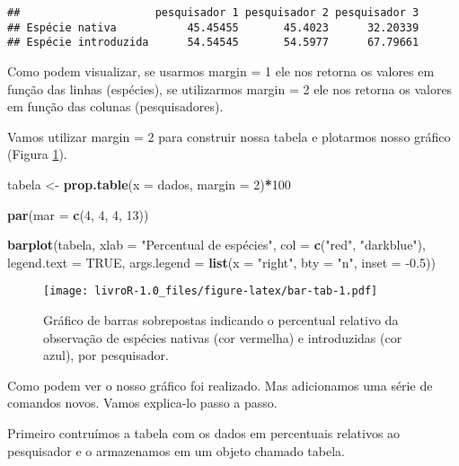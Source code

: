 \documentclass[titlepage, oneside, openany, a4paper]{book}
\newenvironment{Shaded}{\begin{snugshade}}{\end{snugshade}}
\newcommand{\DataTypeTok}[1]{\textcolor[rgb]{0.13,0.29,0.53}{#1}}
\newcommand{\DecValTok}[1]{\textcolor[rgb]{0.00,0.00,0.81}{#1}}
\newcommand{\FloatTok}[1]{\textcolor[rgb]{0.00,0.00,0.81}{#1}}
\newcommand{\KeywordTok}[1]{\textcolor[rgb]{0.13,0.29,0.53}{\textbf{#1}}}
\newcommand{\NormalTok}[1]{#1}
\newcommand{\OperatorTok}[1]{\textcolor[rgb]{0.81,0.36,0.00}{\textbf{#1}}}
\newcommand{\OtherTok}[1]{\textcolor[rgb]{0.56,0.35,0.01}{#1}}
\newcommand{\StringTok}[1]{\textcolor[rgb]{0.31,0.60,0.02}{#1}}
\begin{document}
\begin{verbatim}
##                     pesquisador 1 pesquisador 2 pesquisador 3
## Espécie nativa           45.45455       45.4023      32.20339
## Espécie introduzida      54.54545       54.5977      67.79661
\end{verbatim}

Como podem visualizar, se usarmos margin = 1 ele nos retorna os valores em função das linhas (espécies), se utilizarmos margin = 2 ele nos retorna os valores em função das colunas (pesquisadores).

Vamos utilizar margin = 2 para construir nossa tabela e plotarmos nosso gráfico (Figura \ref{fig:bar-tab}).

\begin{Shaded}
\begin{Highlighting}[]
\NormalTok{tabela <-}\StringTok{ }\KeywordTok{prop.table}\NormalTok{(}\DataTypeTok{x =}\NormalTok{ dados, }\DataTypeTok{margin =} \DecValTok{2}\NormalTok{)}\OperatorTok{*}\DecValTok{100}

\KeywordTok{par}\NormalTok{(}\DataTypeTok{mar =} \KeywordTok{c}\NormalTok{(}\DecValTok{4}\NormalTok{, }\DecValTok{4}\NormalTok{, }\DecValTok{4}\NormalTok{, }\DecValTok{13}\NormalTok{))}

\KeywordTok{barplot}\NormalTok{(tabela, }
        \DataTypeTok{xlab =} \StringTok{"Percentual de espécies"}\NormalTok{,}
        \DataTypeTok{col =} \KeywordTok{c}\NormalTok{(}\StringTok{"red"}\NormalTok{, }\StringTok{"darkblue"}\NormalTok{), }
        \DataTypeTok{legend.text =} \OtherTok{TRUE}\NormalTok{, }
        \DataTypeTok{args.legend =} \KeywordTok{list}\NormalTok{(}\DataTypeTok{x =} \StringTok{"right"}\NormalTok{, }\DataTypeTok{bty =} \StringTok{"n"}\NormalTok{, }\DataTypeTok{inset =} \FloatTok{-0.5}\NormalTok{))}
\end{Highlighting}
\end{Shaded}

\begin{figure}
\centering
\texttt{[image: livroR-1.0\_files/figure-latex/bar-tab-1.pdf]}
\caption{\label{fig:bar-tab}Gráfico de barras sobrepostas indicando o percentual relativo da observação de espécies nativas (cor vermelha) e introduzidas (cor azul), por pesquisador.}
\end{figure}

Como podem ver o nosso gráfico foi realizado. Mas adicionamos uma série de comandos novos. Vamos explica-lo passo a passo.

Primeiro contruímos a tabela com os dados em percentuais relativos ao pesquisador e o armazenamos em um objeto chamado tabela.
\end{document}
